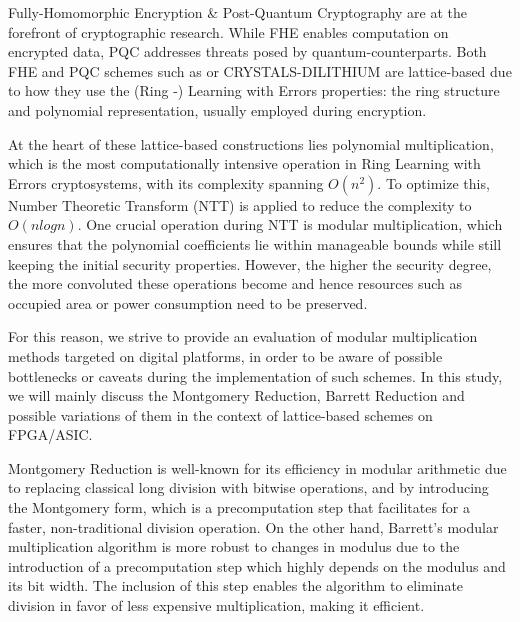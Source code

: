 \documentclass[11pt,
  titlepage=false,
  abstract=on,
]{scrreprt}
\begin{document}
Fully-Homomorphic Encryption \& Post-Quantum Cryptography are at the forefront of cryptographic research. While FHE enables computation on encrypted data, PQC
addresses threats posed by quantum-counterparts. Both FHE and PQC schemes such as \cite{gursoy2022privacy} or CRYSTALS-DILITHIUM \cite{2018crystals} are 
lattice-based due to how they use the (Ring -) Learning with Errors properties: the ring structure and polynomial representation, usually employed during encryption.

At the heart of these lattice-based constructions lies polynomial multiplication, which is the most computationally intensive operation in Ring Learning 
with Errors cryptosystems, with its complexity spanning $O(n^{2})$. To optimize this, Number Theoretic Transform (NTT) is applied to reduce the complexity to $O(nlogn)$.
One crucial operation during NTT is modular multiplication, which ensures that the polynomial coefficients lie within manageable bounds while still keeping the initial 
security properties. However, the higher the security degree, the more convoluted these operations become and hence resources such as occupied area or power consumption 
need to be preserved.

For this reason, we strive to provide an evaluation of modular multiplication methods targeted on digital platforms, in order to be aware of possible bottlenecks 
or caveats during the implementation of such schemes. In this study, we will mainly discuss the Montgomery Reduction, Barrett Reduction and possible variations of them
in the context of lattice-based schemes on FPGA/ASIC.


Montgomery Reduction \cite{montgomery1985modular} is well-known for its efficiency in modular arithmetic due to replacing classical long division with bitwise operations, and by introducing the Montgomery form,
which is a precomputation step that facilitates for a faster, non-traditional division operation.
On the other hand, Barrett's modular multiplication algorithm \cite{barrett1986implementing} is more robust to changes in modulus due to the introduction of a precomputation step which highly depends on the modulus and
its bit width. The inclusion of this step enables the algorithm to eliminate division in favor of less expensive multiplication, making it efficient.
\end{document}

